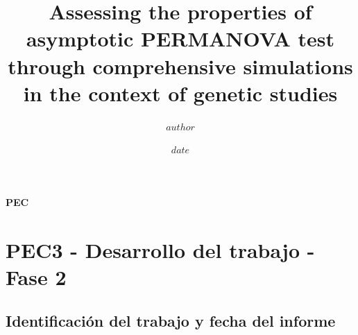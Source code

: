 \documentclass[IB,BIB]{TFUOC}%
\title{Assessing the properties of asymptotic \break PERMANOVA test through comprehensive \break simulations in the context of genetic studies} %
\author{$author$} %
\date{$date$}
\begin{document}
\estructura\label{fitxa}

\renewcommand{\bibname}{Referencias}  
\renewcommand{\tablename}{Tabla}
\renewcommand{\figurename}{Figura}
\renewcommand{\listfigurename}{Índice de figuras}
\renewcommand{\listtablename}{Índice de tablas}

\renewcommand*{\glstextformat}{\textbf}

\newpage

\clearpage
{}

\scriptsize %
\tableofcontents
\normalsize

\newpage

\listoffigures


\newpage

\listoftables


\newpage

\listofmyequations


\newpage\null\thispagestyle{empty} %

\Huge
\vfill

\textbf{PEC}
\normalsize

\newpage





\setcounter{chapter}{-1} %
\chapter{PEC3 - Desarrollo del trabajo - Fase 2}
\label{chap:PEC3 - Desarrollo del trabajo - Fase 2}


\section{Identificación del trabajo y fecha del informe}
\label{sec:Identificación del trabajo y fecha del informe}
\end{document}

